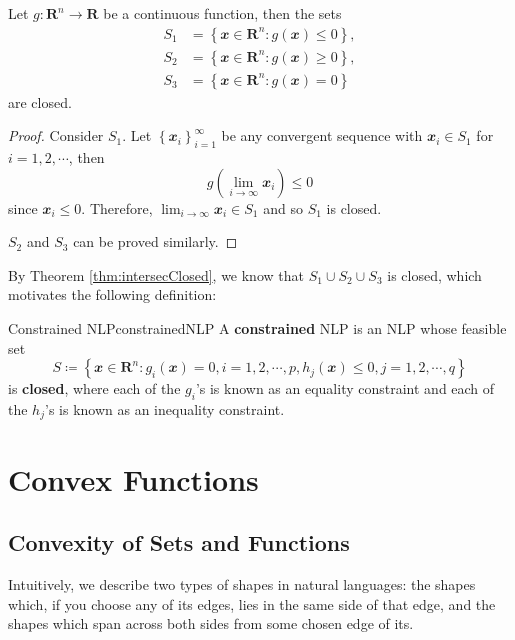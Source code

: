 \documentclass[math, code]{amznotes}
\theoremstyle{remark}
\begin{document}
\begin{thmbox}{}{}
    Let $g \colon \mathbf{R}^n \to \mathbf{R}$ be a continuous function, then the sets
    \begin{align*}
        S_1 & = \left\{\mathbfit{x} \in \mathbf{R}^n \colon g(\mathbfit{x}) \leq 0\right\}, \\
        S_2 & = \left\{\mathbfit{x} \in \mathbf{R}^n \colon g(\mathbfit{x}) \geq 0\right\}, \\
        S_3 & = \left\{\mathbfit{x} \in \mathbf{R}^n \colon g(\mathbfit{x}) = 0\right\}
    \end{align*}
    are closed.
    \tcblower
    \begin{proof}
        Consider $S_1$. Let $\left\{\mathbfit{x}_i\right\}_{i = 1}^\infty$ be any convergent sequence with $\mathbfit{x}_i \in S_1$ for $i = 1, 2, \cdots$, then
        \begin{equation*}
            g\left(\lim_{i \to \infty}\mathbfit{x}_i\right) \leq 0
        \end{equation*}
        since $\mathbfit{x}_i \leq 0$. Therefore, $\lim_{i \to \infty}\mathbfit{x}_i \in S_1$ and so $S_1$ is closed.

        $S_2$ and $S_3$ can be proved similarly.
    \end{proof}
\end{thmbox}
By Theorem \ref{thm:intersecClosed}, we know that $S_1 \cup S_2 \cup S_3$ is closed, which motivates the following definition:
\begin{dfnbox}{Constrained NLP}{constrainedNLP}
    A {\color{red} \textbf{constrained}} NLP is an NLP whose feasible set
    \begin{displaymath}
        S \coloneqq \left\{\mathbfit{x} \in \mathbf{R}^n \colon g_i(\mathbfit{x}) = 0, i = 1, 2, \cdots, p, h_j(\mathbfit{x}) \leq 0, j = 1, 2, \cdots, q\right\}
    \end{displaymath}
    is {\color{red} \textbf{closed}}, where each of the $g_i$'s is known as an equality constraint and each of the $h_j$'s is known as an inequality constraint.
\end{dfnbox}

\chapter{Convex Functions}
\section{Convexity of Sets and Functions}
Intuitively, we describe two types of shapes in natural languages: the shapes which, if you choose any of its edges, lies in the same side of that edge, and the shapes which span across both sides from some chosen edge of its.
\end{document}

